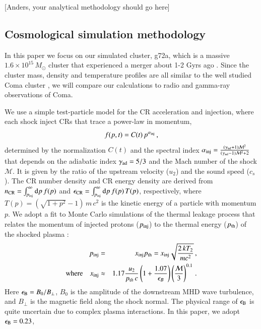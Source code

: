 \documentclass[a4paper,fleqn,usenatbib]{mnras}
\newcommand{\dd}{\mathrm{d}}
\newcommand\eb{\epsilon_\rmn{B}}
\begin{document}
[Anders, your analytical methodology should go here]


\subsection{Cosmological simulation methodology}

In this
paper we focus on our simulated cluster, g72a, which is a massive
$1.6\times10^{15}\,M_\odot$ cluster that experienced a merger about
1-2 Gyrs ago \citep{2009MNRAS.399..497D}. Since the cluster mass,
density and temperature profiles are all similar to the well studied
Coma cluster \citep{2007MNRAS.378..385P,pinzke10}, we will compare our
calculations to radio and gamma-ray observations of Coma.

We use a simple test-particle model for the CR acceleration and
injection, where each shock inject CRs that trace a power-law in
momentum,
\begin{equation}
  f(p,t) = C(t)\,p^{\alpha_{\mathrm{inj}}}\,,
\end{equation}
determined by the normalization $C(t)$ and the spectral index
$\alpha_{\mathrm{inj}}=\frac{(\gamma_{\mathrm{ad}}+1)\mathcal{M}^2}{(\gamma_{\mathrm{ad}}-1)\mathcal{M}^2+2}$
that depends on the adiabatic index $\gamma_{\mathrm{ad}} = 5/3$ and the
Mach number of the shock $\mathcal{M}$. It is given by the ratio of
the upstream velocity ($u_2$) and the sound speed ($c_s$). The CR
number density and CR energy density are derived from $n_\rmn{CR} =
\int_{p_\rmn{inj}}^\infty \dd p\, f(p)$ and $\epsilon_\rmn{CR} =
\int_{p_\rmn{inj}}^\infty \dd p\, f(p) \,T(p)$, respectively, where
$T(p) = (\sqrt{1+p^2} -1)\, m\,c^2$ is the kinetic energy of a
particle with momentum $p$. We adopt a fit to Monte Carlo
simulations of the thermal leakage process that relates the momentum
of injected protons ($p_{\mathrm{inj}}$) to the thermal energy
($p_{\mathrm{th}}$) of the shocked plasma \citep{kang11}:
\begin{eqnarray}
  \label{eq:qinj}
  p_{\mathrm{inj}} &=& x_{\mathrm{inj}} p_{\mathrm{th}} = x_{\mathrm{inj}} \sqrt{\frac{2 \,k T_2}{m c^2}}\,, \nonumber \\
  {\mathrm{where}}\quad x_{\mathrm{inj}} &\approx& 1.17 \frac{u_2}{p_{{\mathrm{t}}h}\,c} \left(1+
  \frac{1.07}{\epsilon_B}\right) \left(\frac{\mathcal{M}}{3}\right)^{0.1}\,.
\end{eqnarray}
Here $\eb = B_0/B_{\perp}$, $B_0$ is the amplitude of the downstream
MHD wave turbulence, and $B_{\perp}$ is the magnetic field along the
shock normal. The physical range of $\eb$ is quite uncertain due to
complex plasma interactions. In this paper, we adopt $\eb = 0.23$,
\end{document}
